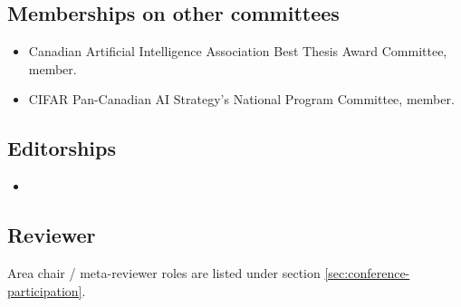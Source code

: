 \documentclass[10pt]{article}
\begin{document}
\subsection{Memberships on other committees} %
\begin{itemize}[leftmargin=5em]
\item[2025] {Canadian Artificial Intelligence Association Best Thesis Award Committee, member.}
\item[2022-23] {CIFAR Pan-Canadian AI Strategy's National Program Committee, member.}
\end{itemize}

\subsection{Editorships}
\begin{itemize}[leftmargin=5em] 
\item[2026--] 
\end{itemize}

\subsection{Reviewer} \label{sec:reviewer} %

Area chair / meta-reviewer roles are listed under section \ref{sec:conference-participation}.
\end{document}
